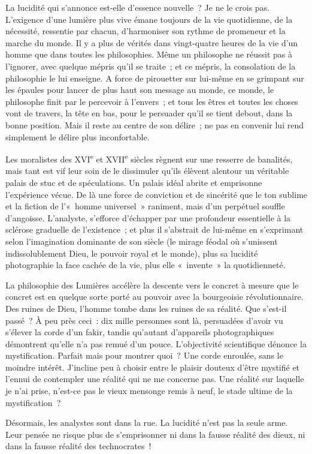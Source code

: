 \documentclass[french,twoside]{book} %
\begin{document}
\noindent La lucidité qui s’annonce est-elle d’essence nouvelle ? Je ne le crois pas. L’exigence d’une lumière plus vive émane toujours de la vie quotidienne, de la nécessité, ressentie par chacun, d’harmoniser son rythme de promeneur et la marche du monde. Il y a plus de vérités dans vingt-quatre heures de la vie d’un homme que dans toutes les philosophies. Même un philosophe ne réussit pas à l’ignorer, avec quelque mépris qu’il se traite ; et ce mépris, la consolation de la philosophie le lui enseigne. A force de pirouetter sur lui-même en se grimpant sur les épaules pour lancer de plus haut son message au monde, ce monde, le philosophe finit par le percevoir à l’envers ; et tous les êtres et toutes les choses vont de travers, la tête en bas, pour le persuader qu’il se tient debout, dans la bonne position. Mais il reste au centre de son délire ; ne pas en convenir lui rend simplement le délire plus inconfortable.\par
Les moralistes des XVI\textsuperscript{e} et XVII\textsuperscript{e} siècles règnent sur une resserre de banalités, mais tant est vif leur soin de le dissimuler qu’ils élèvent alentour un véritable palais de stuc et de spéculations. Un palais idéal abrite et emprisonne l’expérience vécue. De là une force de conviction et de sincérité que le ton sublime et la fiction de l’« homme universel » raniment, mais d’un perpétuel souffle d’angoisse. L’analyste, s’efforce d’échapper par une profondeur essentielle à la sclérose graduelle de l’existence ; et plus il s’abstrait de lui-même en s’exprimant selon l’imagination dominante de son siècle (le mirage féodal où s’unissent indissolublement Dieu, le pouvoir royal et le monde), plus sa lucidité photographie la face cachée de la vie, plus elle « invente » la quotidienneté.\par
La philosophie des Lumières accélère la descente vers le concret à mesure que le concret est en quelque sorte porté au pouvoir avec la bourgeoisie révolutionnaire. Des ruines de Dieu, l’homme tombe dans les ruines de sa réalité. Que s’est-il passé ? À peu près ceci : dix mille personnes sont là, persuadées d’avoir vu s’élever la corde d’un fakir, tandis qu’autant d’appareils photographiques démontrent qu’elle n’a pas remué d’un pouce. L’objectivité scientifique dénonce la mystification. Parfait mais pour montrer quoi ? Une corde enroulée, sans le moindre intérêt. J’incline peu à choisir entre le plaisir douteux d’être mystifié et l’ennui de contempler une réalité qui ne me concerne pas. Une réalité sur laquelle je n’ai prise, n’est-ce pas le vieux mensonge remis à neuf, le stade ultime de la mystification ?\par
Désormais, les analystes sont dans la rue. La lucidité n’est pas la seule arme. Leur pensée ne risque plus de s’emprisonner ni dans la fausse réalité des dieux, ni dans la fausse réalité des technocrates !
\end{document}
